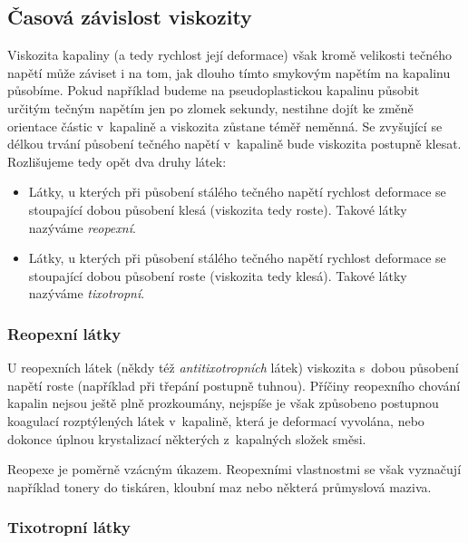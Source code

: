 \documentclass[12pt]{article}
\begin{document}
\subsection{Časová závislost viskozity}%

Viskozita kapaliny (a tedy rychlost její deformace) však kromě velikosti tečného napětí může záviset i na tom, jak dlouho tímto smykovým napětím na kapalinu působíme. Pokud například budeme na pseudoplastickou kapalinu působit určitým tečným napětím jen po zlomek sekundy, nestihne dojít ke změně orientace částic v~kapalině a viskozita zůstane téměř neměnná. Se zvyšující se délkou trvání působení tečného napětí v~kapalině bude viskozita postupně klesat. Rozlišujeme tedy opět dva druhy látek:
\begin{itemize}[noitemsep, topsep = 0pt]
    \item Látky, u kterých při působení stálého tečného napětí rychlost deformace se stoupající dobou působení klesá (viskozita tedy roste). Takové látky nazýváme \emph{reopexní}.
    \item Látky, u kterých při působení stálého tečného napětí rychlost deformace se stoupající dobou působení roste (viskozita tedy klesá). Takové látky nazýváme \emph{tixotropní}.
\end{itemize}

\subsubsection{Reopexní látky}%

U reopexních látek (někdy též \emph{antitixotropních} látek) viskozita s~dobou působení napětí roste (například při třepání postupně tuhnou). Příčiny reopexního chování kapalin nejsou ještě plně prozkoumány, nejspíše je však způsobeno postupnou koagulací rozptýlených látek v~kapalině, která je deformací vyvolána, nebo dokonce úplnou krystalizací některých z~kapalných složek směsi.~\cite{Article:Thixotropy}\cite{wiki:Time-dependent_viscosity}
\par
Reopexe je poměrně vzácným úkazem. Reopexními vlastnostmi se však vyznačují například tonery do tiskáren, kloubní maz nebo některá průmyslová maziva.~\cite{wiki:Rheopecty}

\subsubsection{Tixotropní látky}%
\end{document}
